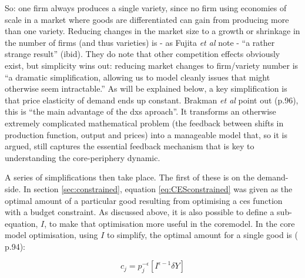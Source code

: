 {%
So: one firm always produces a single variety, since no firm using economies of scale in a market where goods are differentiated can gain from producing more than one variety. Reducing changes in the market size to a growth or shrinkage in the number of firms (and thus varieties) is - as Fujita \emph{et al} note - ``a rather strange result'' (ibid). They do note that other competition effects obviously exist, but simplicity wins out: reducing market changes to firm/variety number is ``a dramatic simplification, allowing us to model cleanly issues that might otherwise seem intractable.'' As will be explained below, a key simplification is that price elasticity of demand ends up constant. Brakman \emph{et al} point out (p.96), this is ``the main advantage of the \gls{dxs} aproach''. It transforms an otherwise extremely complicated mathematical problem (the feedback between shifts in production function, output and prices) into a manageable model that, so it is argued, still captures the essential feedback mechanism that is key to understanding the core-periphery dynamic.

A series of simplifications then take place. The first of these is on the demand-side. In section \ref{sec:constrained}, equation \eqref{eq:CESconstrained} was given as the optimal amount of a particular good resulting from optimising a \gls{ces} function with a budget constraint. As discussed above, it is also possible to define a sub-equation, $I$, to make that optimisation more useful in the \gls{coremodel}. In the core model optimisation, using $I$ to simplify, the optimal amount for a single good is (\citealt{brakman_new_2009} p.94):

\begin{equation}
c_{j} = p_{j}^{-\epsilon}[ I^{\epsilon-1} \delta Y  ]\label{eq:optimalgoodscoremodel}
\end{equation}

}
